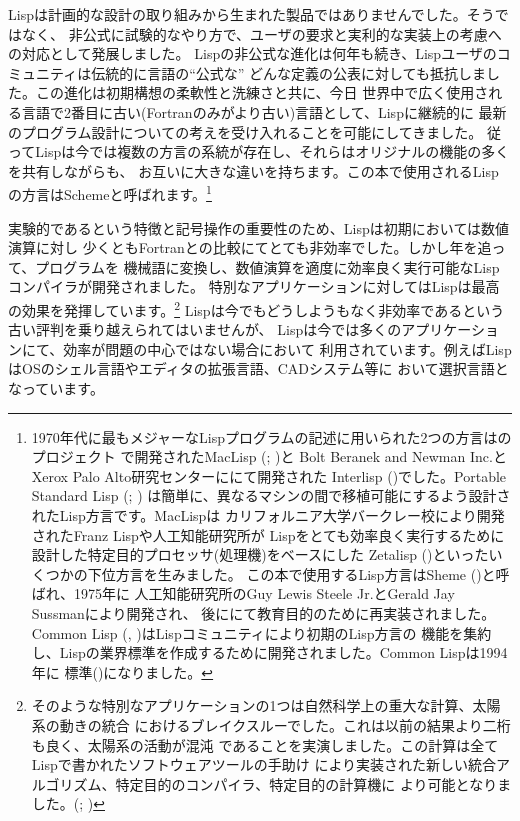 Lispは計画的な設計の取り組みから生まれた製品ではありませんでした。そうではなく、
非公式に試験的なやり方で、ユーザの要求と実利的な実装上の考慮への対応として発展しました。
Lispの非公式な進化は何年も続き、Lispユーザのコミュニティは伝統的に言語の``公式な''
どんな定義の公表に対しても抵抗しました。この進化は初期構想の柔軟性と洗練さと共に、今日
世界中で広く使用される言語で2番目に古い(Fortranのみがより古い)言語として、Lispに継続的に
最新のプログラム設計についての考えを受け入れることを可能にしてきました。
従ってLispは今では複数の方言の系統が存在し、それらはオリジナルの機能の多くを共有しながらも、
お互いに大きな違いを持ちます。この本で使用されるLispの方言はSchemeと呼ばれます。\footnote{
1970年代に最もメジャーなLispプログラムの記述に用いられた2つの方言はのプロジェクト
で開発されたMacLisp (; )と
Bolt Beranek and Newman Inc.とXerox Palo Alto研究センターににて開発された
Interlisp ()でした。Portable Standard Lisp (; )
は簡単に、異なるマシンの間で移植可能にするよう設計されたLisp方言です。MacLispは
カリフォルニア大学バークレー校により開発されたFranz Lispや人工知能研究所が
Lispをとても効率良く実行するために設計した特定目的プロセッサ(処理機)をベースにした
Zetalisp ()といったいくつかの下位方言を生みました。
この本で使用するLisp方言はSheme ()と呼ばれ、1975年に
人工知能研究所のGuy Lewis Steele Jr.とGerald Jay Sussmanにより開発され、
後ににて教育目的のために再実装されました。
Common Lisp (, )はLispコミュニティにより初期のLisp方言の
機能を集約し、Lispの業界標準を作成するために開発されました。Common Lispは1994年に
標準()になりました。
}



実験的であるという特徴と記号操作の重要性のため、Lispは初期においては数値演算に対し
少くともFortranとの比較にてとても非効率でした。しかし年を追って、プログラムを
機械語に変換し、数値演算を適度に効率良く実行可能なLispコンパイラが開発されました。
特別なアプリケーションに対してはLispは最高の効果を発揮しています。\footnote{
そのような特別なアプリケーションの1つは自然科学上の重大な計算、太陽系の動きの統合
におけるブレイクスルーでした。これは以前の結果より二桁も良く、太陽系の活動が混沌
であることを実演しました。この計算は全てLispで書かれたソフトウェアツールの手助け
により実装された新しい統合アルゴリズム、特定目的のコンパイラ、特定目的の計算機に
より可能となりました。(; )}
Lispは今でもどうしようもなく非効率であるという古い評判を乗り越えられてはいませんが、
Lispは今では多くのアプリケーションにて、効率が問題の中心ではない場合において
利用されています。例えばLispはOSのシェル言語やエディタの拡張言語、CADシステム等に
おいて選択言語となっています。



